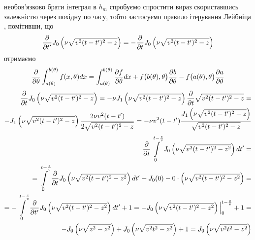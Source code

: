необов'язково брати інтеграл в $ h_m $ спробуємо спростити вираз 
скориставшись залежністю через похідну по часу, тобто застосуємо 
правило ітерування Лейбніца \cite{imp:Flanders1973}, помітивши, що
%
\begin{equation*} \begin{aligned}
\frac{\partial }{\partial t'} J_0 \left( \nu \sqrt{v^2 (t-t')^2 - z} \right) =
- \frac{\partial }{\partial t} J_0 \left( \nu \sqrt{v^2 (t-t')^2 - z} \right) 
\end{aligned} \end{equation*}
%
отримаємо
%
\textcolor{blue} { \begin{equation*} \begin{aligned}
\frac{\partial }{\partial \theta} \int_{a(\theta)}^{b(\theta)} f(x,\theta) dx = 
\int_{a(\theta)}^{b(\theta)} \frac{\partial f}{\partial \theta} dx + 
f\big( b(\theta), \theta \big) \frac{\partial b}{\partial \theta} -
f\big( a(\theta), \theta \big) \frac{\partial a}{\partial \theta}
\end{aligned} \end{equation*} }
%
\textcolor{blue} { \begin{equation*} \begin{aligned}
\frac{\partial }{\partial t} J_0 \left( \nu \sqrt{v^2 (t-t')^2 - z} \right) = 
- \nu J_1 \left( \nu \sqrt{v^2 (t-t')^2 - z} \right) 
\frac{\partial }{\partial t} \sqrt{v^2 (t-t')^2 - z} = \\
-  J_1 \left( \nu \sqrt{v^2 (t-t')^2 - z} \right)
\frac{2 \nu v^2 (t-t')}{2 \sqrt{v^2 (t-t')^2 - z}} = - \nu v^2 (t-t') 
\frac{J_1 \left( \nu \sqrt{v^2 (t-t')^2 - z} \right)}
     {\sqrt{v^2 (t-t')^2 - z}}
\end{aligned} \end{equation*} }
%
\textcolor{blue} { \begin{equation*} \begin{aligned}
\frac{\partial }{\partial t} \int \limits_{0}^{t - \frac{z}{v}} 
J_0 \left( \nu \sqrt{v^2 (t-t')^2 - z^2} \right) dt' = \\
= \int \limits_{0}^{t - \frac{z}{v}} 
\frac{\partial }{\partial t} J_0 \left( \nu \sqrt{v^2 (t-t')^2 - z^2} \right) dt' +
J_0 (0) - 0 \cdot \left( \nu \sqrt{v^2 (t-t')^2 - z^2} \right) = \\
= - \int \limits_{0}^{t - \frac{z}{v}} 
\frac{\partial }{\partial t'} J_0 \left( \nu \sqrt{v^2 (t-t')^2 - z^2} \right) dt' + 1 =
- \Big. J_0 \left( \nu \sqrt{v^2 (t-t')^2 - z^2} \right) \Big|_{0}^{t - \frac{z}{v}} + 1 = \\
- J_0 \left( \nu \sqrt{z^2 - z^2} \right) + J_0 \left( \nu \sqrt{v^2 t^2 - z^2} \right) + 1 = 
J_0 \left( \nu \sqrt{v^2 t^2 - z^2} \right)
\end{aligned} \end{equation*} }
